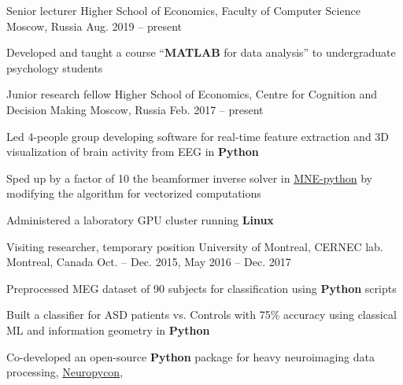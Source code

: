 
\begin{cventries}
  \cventry
    {Senior lecturer}
    {Higher School of Economics, Faculty of Computer Science}
    {Moscow, Russia}
    {Aug. 2019 -- present}
    {
      \begin{cvitems}
      \item Developed and taught a course ``\textbf{MATLAB} for data analysis'' to undergraduate psychology students
      \end{cvitems}
    }
  \cventry
    {Junior research fellow}
    {Higher School of Economics, Centre for Cognition and Decision Making}
    {Moscow, Russia}
    {Feb. 2017 -- present}
    {
      \begin{cvitems}
      \item{Led 4-people group developing software for real-time feature extraction and 3D visualization of brain activity from EEG in \textbf{Python}}
        \item{Sped up by a factor of 10 the beamformer inverse solver in \href{https://github.com/mne-tools/mne-python}{MNE-python} by modifying the algorithm for vectorized computations}
        \item{Administered a laboratory GPU cluster running \textbf{Linux}}
      \end{cvitems}
    }
  \cventry
    {Visiting researcher, temporary position}
    {University of Montreal, CERNEC lab.}
    {Montreal, Canada}
    {Oct. -- Dec. 2015, May 2016 -- Dec. 2017}
    {
      \begin{cvitems}
      \item {Preprocessed MEG dataset of 90 subjects for classification using \textbf{Python} scripts}
      \item{Built a classifier for ASD patients vs. Controls with 75\% accuracy using classical ML and information geometry in \textbf{Python}}
          \item{Co-developed an open-source \textbf{Python} package for heavy neuroimaging data processing, \href{https://github.com/neuropycon}{Neuropycon}, \cite{Neuropycon}}

\end{cvitems}}
\end{cventries}
